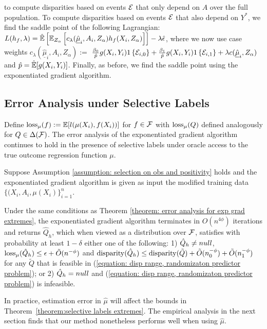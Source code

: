 \documentclass{article}
\begin{document}
to compute disparities based on events $\mathcal{E}$ that only depend on $A$ over the full population. To compute disparities based on events $\mathcal{E}$ that also depend on $Y^*$, we find the saddle point of the following Lagrangian: ${L(h_f, \lambda) = \hat{\mathbb{E}}\left[ \mathbb{E}_{Z_\alpha}\left[ c_\lambda(\underline{\hat{\mu}}_i, A_i, Z_\alpha) h_f(X_i, Z_\alpha) \right] \right] - \lambda \hat{\epsilon}}$, where we now use case weights ${c_\lambda(\underline{\hat{\mu}}_i, A_i, Z_\alpha) :=}$ ${\frac{\beta_0}{\hat{p}}g(X_i,Y_i) 1\left\{ \mathcal{E}_{i,0} \right\} + \frac{\beta_1}{\hat{p}}g(X_i,Y_i) 1\left\{ \mathcal{E}_{i,1} \right\} + \lambda c(\underline{\hat{\mu}}_i, Z_\alpha)}$ and $\hat{p} =\hat{\mathbb{E}}[g(X_i, Y_i)]$. Finally, as before, we find the saddle point using the exponentiated gradient algorithm.

\subsection{Error Analysis under Selective Labels} \label{section:error analysis under selective labels}
Define $\operatorname{loss}_\mu(f) := \mathbb{E}[l(\mu(X_i), f(X_i))]$ for $f \in \mathcal{F}$ with $\operatorname{loss}_\mu(Q)$ defined analogously for $Q \in \Delta(\mathcal{F})$. The error analysis of the exponentiated gradient algorithm continues to hold in the presence of selective labels under oracle access to the true outcome regression function $\mu$.

\begin{theorem}\label{theorem:selective labels extremes}
Suppose Assumption \ref{assumption: selection on obs and positivity} holds and the exponentiated gradient algorithm is given as input the modified training data $\{(X_i, A_i, \mu(X_i)\}_{i=1}^{n}$.

Under the same conditions as Theorem \ref{theorem: error analysis for exp grad extremes}, the exponentiated gradient algorithm terminates in $O(n^{4\phi})$ iterations and returns $\hat{Q}_h$, which when viewed as a distribution over $\mathcal{F}$, satisfies with probability at least $1-\delta$ either one of the following: 1) $\hat{Q}_h \neq null$, $\operatorname{loss}_\mu(\hat{Q}_h) \leq \epsilon + \tilde{O}(n^{-\phi})$ and $\operatorname{disparity}(\hat{Q}_h) \leq \operatorname{disparity}(\tilde{Q}) + \tilde{O}(n_0^{-\phi}) + \tilde{O}(n_1^{-\phi})$ for any $\tilde{Q}$ that is feasible in (\ref{equation: disp range, randomizaton predictor problem}); or 2) $\hat{Q}_h = null$ and (\ref{equation: disp range, randomizaton predictor problem}) is infeasible.
\end{theorem}
In practice, estimation error in $\hat{\mu}$ will affect the bounds in Theorem~\ref{theorem:selective labels extremes}. The empirical analysis in the next section finds that our method nonetheless performs well when using $\hat{\mu}$.
\end{document}
